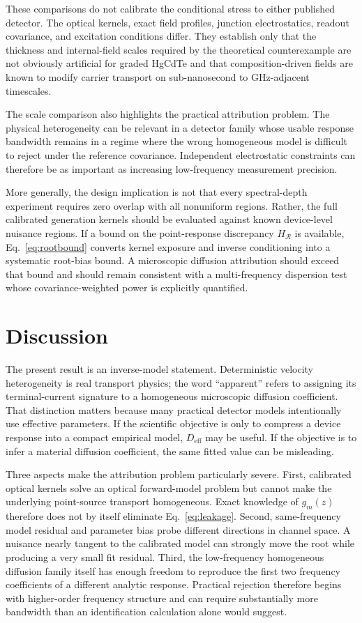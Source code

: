 \documentclass[aps,pra,twocolumn,superscriptaddress,nofootinbib]{revtex4-2}
\newcommand{\Deff}{D_{\mathrm{eff}}}
\newcommand{\Rregion}{\mathcal{R}}
\begin{document}
These comparisons do not calibrate the conditional stress to either published detector. The optical kernels, exact field profiles, junction electrostatics, readout covariance, and excitation conditions differ. They establish only that the thickness and internal-field scales required by the theoretical counterexample are not obviously artificial for graded HgCdTe and that composition-driven fields are known to modify carrier transport on sub-nanosecond to GHz-adjacent timescales.

The scale comparison also highlights the practical attribution problem. The physical heterogeneity can be relevant in a detector family whose usable response bandwidth remains in a regime where the wrong homogeneous model is difficult to reject under the reference covariance. Independent electrostatic constraints can therefore be as important as increasing low-frequency measurement precision.

More generally, the design implication is not that every spectral-depth experiment requires zero overlap with all nonuniform regions. Rather, the full calibrated generation kernels should be evaluated against known device-level nuisance regions. If a bound on the point-response discrepancy $H_{\Rregion}$ is available, Eq.~\eqref{eq:rootbound} converts kernel exposure and inverse conditioning into a systematic root-bias bound. A microscopic diffusion attribution should exceed that bound and should remain consistent with a multi-frequency dispersion test whose covariance-weighted power is explicitly quantified.

\section{Discussion}

The present result is an inverse-model statement. Deterministic velocity heterogeneity is real transport physics; the word ``apparent'' refers to assigning its terminal-current signature to a homogeneous microscopic diffusion coefficient. That distinction matters because many practical detector models intentionally use effective parameters. If the scientific objective is only to compress a device response into a compact empirical model, $\Deff$ may be useful. If the objective is to infer a material diffusion coefficient, the same fitted value can be misleading.

Three aspects make the attribution problem particularly severe. First, calibrated optical kernels solve an optical forward-model problem but cannot make the underlying point-source transport homogeneous. Exact knowledge of $g_m(z)$ therefore does not by itself eliminate Eq.~\eqref{eq:leakage}. Second, same-frequency model residual and parameter bias probe different directions in channel space. A nuisance nearly tangent to the calibrated model can strongly move the root while producing a very small fit residual. Third, the low-frequency homogeneous diffusion family itself has enough freedom to reproduce the first two frequency coefficients of a different analytic response. Practical rejection therefore begins with higher-order frequency structure and can require substantially more bandwidth than an identification calculation alone would suggest.
\end{document}
